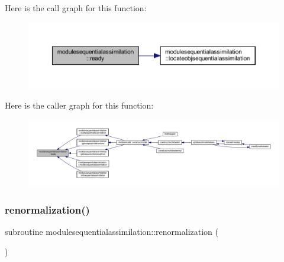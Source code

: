 Here is the call graph for this function\+:\nopagebreak
\begin{figure}[H]
\begin{center}
\leavevmode
\includegraphics[width=350pt]{namespacemodulesequentialassimilation_a612c7f8e7d5560ffd80850c43f9e9c35_cgraph}
\end{center}
\end{figure}
Here is the caller graph for this function\+:\nopagebreak
\begin{figure}[H]
\begin{center}
\leavevmode
\includegraphics[width=350pt]{namespacemodulesequentialassimilation_a612c7f8e7d5560ffd80850c43f9e9c35_icgraph}
\end{center}
\end{figure}
\mbox{\label{namespacemodulesequentialassimilation_a5ba1ccc67425087e399ba6f24403f98e}} 
\subsubsection{\texorpdfstring{renormalization()}{renormalization()}}
{\footnotesize\ttfamily subroutine modulesequentialassimilation\+::renormalization (\begin{DoxyParamCaption}{ }\end{DoxyParamCaption})\hspace{0.3cm}{\ttfamily [private]}}

